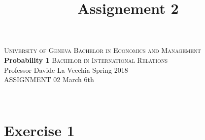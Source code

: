 \documentclass[12pt,thmsa]{article}
\title{Assignement 2}
\begin{document}
\noindent \textsc{University of Geneva}     \hfill \textsc{Bachelor in Economics and Management} \\
\textbf{Probability 1}                      \hfill \textsc{Bachelor in International Relations} \\
Professor Davide La Vecchia                 \hfill Spring 2018  \\
ASSIGNMENT 02                               \hfill   March 6th



\noindent
\makebox[\linewidth]{\rule{\textwidth}{0.4pt}}\\[1.5ex]





\section*{Exercise 1}
\end{document}
